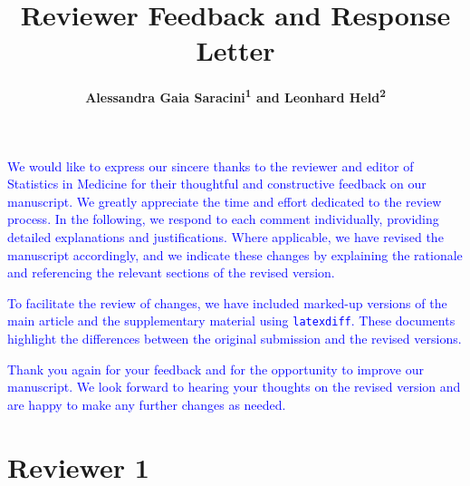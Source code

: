 \documentclass{article}
\date{}
\begin{document}
\title{ \huge{\textbf{Reviewer Feedback and Response Letter}}\\[0.5em]
}

\author{\textbf{Alessandra Gaia Saracini\textsuperscript{1} and Leonhard Held\textsuperscript{2}}}


\maketitle


\textcolor{blue}{
We would like to express our sincere thanks to the reviewer and editor of Statistics in Medicine for their thoughtful and constructive feedback on our manuscript. We greatly appreciate the time and effort dedicated to the review process. In the following, we respond to each comment individually, providing detailed explanations and justifications. Where applicable, we have revised the manuscript accordingly, and we indicate these changes by explaining the rationale and referencing the relevant sections of the revised version.}

\bigskip

\textcolor{blue}{
  To facilitate the review of changes, we have included marked-up versions of the main article and the supplementary material using \texttt{latexdiff}. These documents highlight the differences between the original submission %
  and the revised versions.} %

\bigskip
\textcolor{blue}{
Thank you again for your feedback and for the opportunity to improve our manuscript. We look forward to hearing your thoughts on the revised version and are happy to make any further changes as needed.}



\section*{Reviewer 1}
\end{document}
